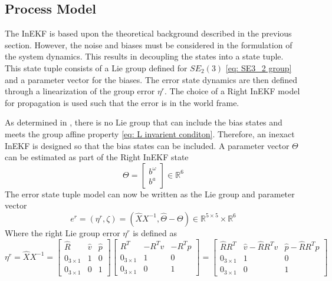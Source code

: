 \subsection{Process Model}
The InEKF is based upon the theoretical background described in the previous section. However, the noise and biases must be considered in the formulation of the system dynamics. This results in decoupling the states into a state tuple. This state tuple consists of a Lie group defined for $SE_2(3)$ \eqref{eq: SE3_2 group} and a parameter vector for the biases. The error state dynamics are then defined through a linearization of the group error $\eta^r$. The choice of a Right InEKF model for propagation is used such that the error is in the world frame. 

As determined in \cite{DBLP:journals/corr/BarrauB14}, there is no Lie group that can include the bias states and meets the group affine property \eqref{eq: L invarient conditon}. Therefore, an inexact InEKF is designed so that the bias states can be included. A parameter vector $\Theta$ can be estimated as part of the Right InEKF state \cite{Contact-Aided_Invarant_EKF}
\begin{equation}
    \Theta = \begin{bmatrix}
        b^{\omega} \\
        b^a
    \end{bmatrix}  \in \mathbb{R}^6
    \label{eq: Theta RInEKF}
\end{equation}
The error state tuple model can now be written as the Lie group and parameter vector \cite{Contact-Aided_Invarant_EKF}
\begin{equation}
    e^r = (\eta^r, \zeta) = (\hat{X} X^{-1}, \hat{\Theta} - \Theta) \in \mathbb{R}^{5 \times 5} \times \mathbb{R}^6
    \label{eq: e^r state tuple}
\end{equation}
Where the right Lie group error $\eta^r$ is defined as
\begin{equation}
    \eta^r = \hat{X} X^{-1} = 
        \begin{bmatrix}
            \hat{R} & \hat{v} & \hat{p}\\
            0_{3 \times 1} & 1 & 0\\
            0_{3 \times 1} & 0 & 1
        \end{bmatrix}
        \begin{bmatrix}
            R^T & -R^T v & -R^T p \\
            0_{3 \times 1} & 1 & 0\\
            0_{3 \times 1} & 0 & 1
        \end{bmatrix} =
        \begin{bmatrix}
            \hat{R} R^T & \hat{v} - \hat{R} R^T v & \hat{p} - \hat{R} R^T p\\
            0_{3 \times 1} & 1 & 0\\
            0_{3 \times 1} & 0 & 1
        \end{bmatrix}
    \label{eq: eta^r full}
\end{equation}
